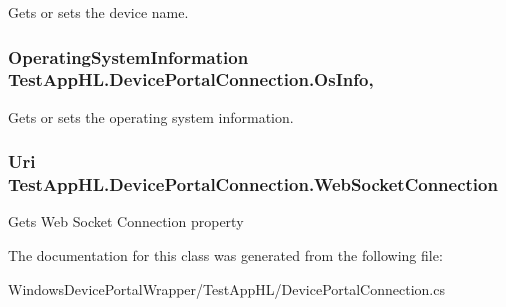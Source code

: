 Gets or sets the device name. 

\subsubsection[{\texorpdfstring{Os\+Info}{OsInfo}}]{\setlength{\rightskip}{0pt plus 5cm}Operating\+System\+Information Test\+App\+H\+L.\+Device\+Portal\+Connection.\+Os\+Info\hspace{0.3cm}{\ttfamily [get]}, {\ttfamily [set]}}\hypertarget{class_test_app_h_l_1_1_device_portal_connection_ab66961eebc3e8ad6794bda0fa51d8767}{}\label{class_test_app_h_l_1_1_device_portal_connection_ab66961eebc3e8ad6794bda0fa51d8767}


Gets or sets the operating system information. 

\subsubsection[{\texorpdfstring{Web\+Socket\+Connection}{WebSocketConnection}}]{\setlength{\rightskip}{0pt plus 5cm}Uri Test\+App\+H\+L.\+Device\+Portal\+Connection.\+Web\+Socket\+Connection\hspace{0.3cm}{\ttfamily [get]}}\hypertarget{class_test_app_h_l_1_1_device_portal_connection_a94895144a15d86fbf37bb03aef701313}{}\label{class_test_app_h_l_1_1_device_portal_connection_a94895144a15d86fbf37bb03aef701313}


Gets Web Socket Connection property 



The documentation for this class was generated from the following file\+:\begin{DoxyCompactItemize}
\item 
Windows\+Device\+Portal\+Wrapper/\+Test\+App\+H\+L/Device\+Portal\+Connection.\+cs\end{DoxyCompactItemize}
